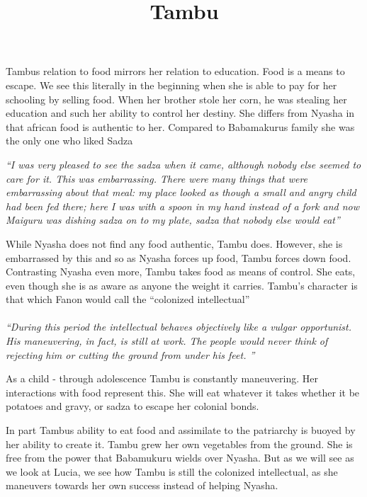\documentclass{article}
\title{Tambu}
\begin{document}
Tambus relation to food mirrors her relation to education. Food is a means to escape. We see this literally in the beginning when she is able to pay for her schooling by selling food. When her brother stole her corn, he was stealing her education and such her ability to control her destiny. She differs from Nyasha in that african food is authentic to her. Compared to Babamakurus family she was the only one who liked Sadza 

\textit{``I was very pleased to see the sadza when it came, although nobody else seemed to care for it. This was embarrassing. There were many things that were embarrassing about that meal: my place looked as though a small and angry child had been fed there; here I was with a spoon in my hand instead of a fork and now Maiguru was dishing sadza on to my plate, sadza that nobody else would eat'' } 

While Nyasha does not find any food authentic, Tambu does. However, she is embarrassed by this and so as Nyasha forces up food, Tambu forces down food. Contrasting Nyasha even more, Tambu takes food as means of control. She eats, even though she is as aware as anyone the weight it carries. Tambu's character is that which Fanon would call the ``colonized intellectual'' 
\paragraph{}
\textit{``During this period the intellectual behaves objectively like a vulgar opportunist. His maneuvering, in fact, is still at work. The people would never think of rejecting him or cutting the ground from under his feet. ''}

As a child - through adolescence Tambu is constantly maneuvering. Her interactions with food represent this. She will eat whatever it takes whether it be potatoes and gravy, or sadza to escape her colonial bonds.

In part Tambus ability to eat food and assimilate to the patriarchy is buoyed by her ability to create it. Tambu grew her own vegetables from the ground. She is free from the power that Babamukuru wields over Nyasha. But as we will see as we look at Lucia,  we see how Tambu is still the colonized intellectual, as she maneuvers towards her own success instead of helping Nyasha.
\end{document}
